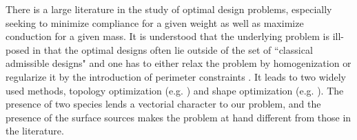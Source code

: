 \documentclass[11pt]{article}
\begin{document}
There is  a large literature in the study of optimal design problems, especially seeking to minimize compliance for a given weight as well as maximize conduction for a given mass.  It is understood that the underlying problem is ill-posed in that the optimal designs often lie outside of the set of ``classical admissible designs" and one has to either relax the problem by homogenization \cite{Goodman, kohnstrang1} or regularize it by the introduction of perimeter constraints  \cite{Ambrosio1993,bourdin}.  It leads to two widely used methods, topology optimization  (e.g. \cite{bendsoetopology}) and shape optimization (e.g. \cite{allaire}).  The presence of two species lends a vectorial character to our problem, and the presence of the surface sources makes the problem at hand different from those in the literature.

\end{document}

